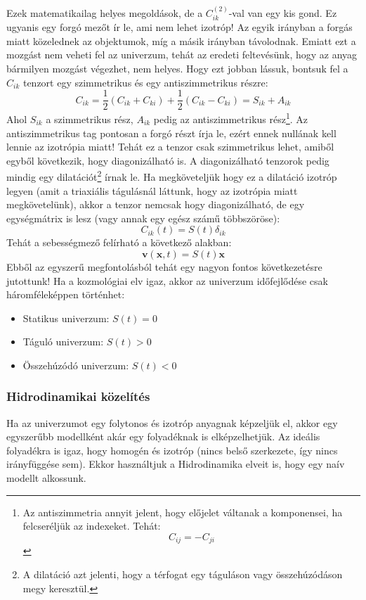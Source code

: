 \documentclass[../main.tex]{subfiles}
\begin{document}
Ezek matematikailag helyes megoldások, de a $C^{(2)}_{ik}$-val van egy kis gond. Ez ugyanis egy forgó mezőt ír le, ami nem lehet izotróp! Az egyik irányban a forgás miatt közelednek az objektumok, míg a másik irányban távolodnak.
Emiatt ezt a mozgást nem veheti fel az univerzum, tehát az eredeti feltevésünk, hogy az anyag bármilyen mozgást végezhet, nem helyes. Hogy ezt jobban lássuk, bontsuk fel a $C_{ik}$ tenzort egy szimmetrikus és egy antiszimmetrikus részre:
\begin{equation}
    C_{ik} = \frac{1}{2} (C_{ik} + C_{ki}) + \frac{1}{2} (C_{ik} - C_{ki}) = S_{ik} + A_{ik}
\end{equation}
Ahol $S_{ik}$ a szimmetrikus rész, $A_{ik}$ pedig az antiszimmetrikus rész\footnote{
    Az antiszimmetria annyit jelent, hogy előjelet váltanak a komponensei, ha felcseréljük az indexeket. Tehát:
    \begin{equation}
        C_{ij} = - C_{ji}
    \end{equation}
}.
Az antiszimmetrikus tag pontosan a forgó részt írja le, ezért ennek nullának kell lennie az izotrópia miatt! Tehát ez a tenzor csak szimmetrikus lehet, amiből egyből következik, hogy diagonizálható is.
A diagonizálható tenzorok pedig mindig egy dilatációt\footnote{
    A dilatáció azt jelenti, hogy a térfogat egy táguláson vagy összehúzódáson megy keresztül. 
} írnak le. Ha megköveteljük hogy ez a dilatáció izotróp legyen (amit a triaxiális tágulásnál láttunk, hogy az izotrópia miatt megkövetelünk), akkor a tenzor nemcsak hogy diagonizálható, de egy egységmátrix is lesz
(vagy annak egy egész számű többszöröse):
\begin{equation}
    C_{ik}(t) = S(t) \delta_{ik}
\end{equation}
Tehát a sebességmező felírható a következő alakban:
\begin{equation}
    \mathbf{v}(\mathbf{x}, t) = S(t) \mathbf{x}
\end{equation}
Ebből az egyszerű megfontolásból tehát egy nagyon fontos következetésre jutottunk! Ha a kozmológiai elv igaz, akkor az univerzum időfejlődése csak háromféleképpen történhet:
\begin{itemize}
    \item Statikus univerzum: $S(t) = 0$
    \item Táguló univerzum: $S(t) > 0$
    \item Összehúzódó univerzum: $S(t) < 0$
\end{itemize}

\subsubsection{Hidrodinamikai közelítés}
Ha az univerzumot egy folytonos és izotróp anyagnak képzeljük el, akkor egy egyszerűbb modellként akár egy folyadéknak is elképzelhetjük. Az ideális folyadékra is igaz, hogy homogén és izotróp (nincs belső szerkezete, így nincs irányfüggése sem).
Ekkor használtjuk a Hidrodinamika elveit is, hogy egy naív modellt alkossunk. 
\end{document}
